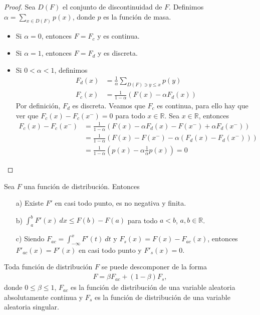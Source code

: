 \begin{proof}
    Sea $D(F)$ el conjunto de discontinuidad de $F$. Definimos $\alpha = \sum_{x \in D(F)} p(x)$, donde $p$ es la función de masa.
    \begin{itemize}
        \item Si $\alpha = 0$, entonces $F = F_c$ y es continua.
        \item Si $\alpha = 1$, entonces $F = F_d$ y es discreta.
        \item Si $0 < \alpha < 1$, definimos
        \begin{align*}
            F_d(x) &= \frac{1}{\alpha} \sum_{ D(F) \ni y \leq x} p(y) \\
            F_c(x) &= \frac{1}{1-\alpha}(F(x) - \alpha F_d(x))
        \end{align*}
        Por definición, $F_d$ es discreta. Veamos que $F_c$ es continua, para ello hay que ver que $F_c(x) - F_c(x^-) = 0$ para todo $x \in \mathbb{R}$. Sea $x \in \mathbb{R}$, entonces
        \begin{align*}
            F_c(x) - F_c(x^-) &= \frac{1}{1-\alpha}(F(x) - \alpha F_d(x) - F(x^-) + \alpha F_d(x^-)) \\
            &= \frac{1}{1-\alpha}(F(x) - F(x^-) - \alpha (F_d(x) - F_d(x^-))) \\
            &= \frac{1}{1-\alpha}\left(p(x) - \alpha \frac{1}{\alpha} p(x)\right) = 0
        \end{align*}
    \end{itemize}
\end{proof}

\begin{lema}
    Sea $F$ una función de distribución. Entonces
    \begin{enumerate}
        \item[a)] Existe $F'$ en casi todo punto, es no negativa y finita.
        \item[b)] $\int_{a}^{b} F'(x) \ dx \leq F(b) - F(a)$ para todo $a < b$, $a,b \in \mathbb{R}$.
        \item[c)] Siendo $F_{ac} = \int_{-\infty}^{x} F'(t) \ dt$ y $F_s(x) = F(x) - F_{ac}(x)$, entonces $F'_{ac}(x) = F'(x)$ en casi todo punto y $F'_s(x) = 0$.
    \end{enumerate}
\end{lema}

\begin{teo}
        Toda función de distribución $F$ se puede descomponer de la forma 
    \begin{align*}
        F = \beta F_{ac} + (1-\beta)F_s, 
    \end{align*}
    donde $0 \leq \beta \leq 1$, $F_{ac}$ es la función de distribución de una variable aleatoria absolutamente continua y $F_s$ es la función de distribución de una variable aleatoria singular.
\end{teo}

